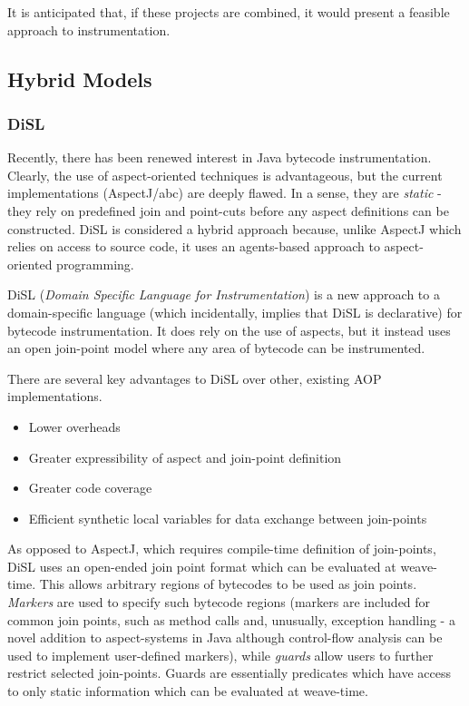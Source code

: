                It is anticipated that, if these projects are combined, it would present a feasible approach to instrumentation.

        \subsection{Hybrid Models} \label{sec:instrumentation/hybrid}
                \subsubsection{DiSL} \label{sec:instrumentation/hybrid/disl}
                Recently, there has been renewed interest in Java bytecode instrumentation. Clearly, the use of aspect-oriented techniques is advantageous, but the current implementations (AspectJ/abc) are deeply flawed. In a sense, they are \textit{static} - they rely on predefined join and point-cuts before any aspect definitions can be constructed. DiSL is considered a hybrid approach because, unlike AspectJ which relies on access to source code, it uses an agents-based approach to aspect-oriented programming.

                DiSL (\textit{Domain Specific Language for Instrumentation}) \citep{Marek2012} is a new approach to a domain-specific language (which incidentally, implies that DiSL is declarative) for bytecode instrumentation. It does rely on the use of aspects, but it instead uses an open join-point model where any area of bytecode can be instrumented.
                
                There are several key advantages to DiSL over other, existing AOP implementations.

                \begin{itemize}
                        \item Lower overheads
                        \item Greater expressibility of aspect and join-point definition
                        \item Greater code coverage
                        \item Efficient synthetic local variables for data exchange between join-points
                \end{itemize}

                As opposed to AspectJ, which requires compile-time definition of join-points, DiSL uses an open-ended join point format which can be evaluated at weave-time. This allows arbitrary regions of bytecodes to be used as join points. \textit{Markers} are used to specify such bytecode regions (markers are included for common join points, such as method calls and, unusually, exception handling - a novel addition to aspect-systems in Java although control-flow analysis can be used to implement user-defined markers), while \textit{guards} allow users to further restrict selected join-points. Guards are essentially predicates which have access to only static information which can be evaluated at weave-time.

